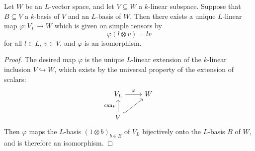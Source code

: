 \begin{corollary}
\label{corollary: inclusion to bijection vector spaces}
  Let $W$ be an $L$-vector space, and let $V \subseteq W$ a $k$-linear subspace.
  Suppose that $B \subseteq V$ a $k$-basis of $V$ and an $L$-basis of $W$.
  Then there exists a unique $L$-linear map $\varphi \colon V_L \to W$ which is given on simple tensors by
  \[
      \varphi(l \otimes v)
    = l v
  \]
  for all $l \in L$, $v \in V$, and $\varphi$ is an isomorphism.
\end{corollary}


\begin{proof}
  The desired map $\varphi$ is the unique $L$-linear extension of the $k$-linear inclusion $V \hookrightarrow W$, which exists by the universal property of the extension of scalars:
  \[
    \begin{tikzcd}
        V_L
        \arrow{r}[above]{\varphi}
      & W
      \\
        V
        \arrow{u}[left]{\can_V}
        \arrow[hookrightarrow]{ru}
      & {}
    \end{tikzcd}
  \]
  Then $\varphi$ maps the $L$-basis $(1 \otimes b)_{b \in B}$ of $V_L$ bijectively onto the $L$-basis $B$ of $W$, and is therefore an isomorphism.
\end{proof}


